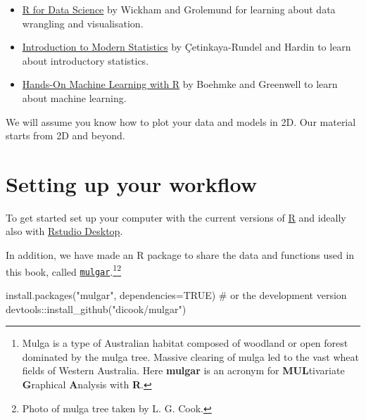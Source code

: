 \documentclass[
  letterpaper,
]{krantz}
\newenvironment{Shaded}{\begin{snugshade}}{\end{snugshade}}
\newcommand{\AttributeTok}[1]{\textcolor[rgb]{0.40,0.45,0.13}{#1}}
\newcommand{\CommentTok}[1]{\textcolor[rgb]{0.37,0.37,0.37}{#1}}
\newcommand{\ConstantTok}[1]{\textcolor[rgb]{0.56,0.35,0.01}{#1}}
\newcommand{\FunctionTok}[1]{\textcolor[rgb]{0.28,0.35,0.67}{#1}}
\newcommand{\NormalTok}[1]{\textcolor[rgb]{0.00,0.23,0.31}{#1}}
\newcommand{\SpecialCharTok}[1]{\textcolor[rgb]{0.37,0.37,0.37}{#1}}
\newcommand{\StringTok}[1]{\textcolor[rgb]{0.13,0.47,0.30}{#1}}
\providecommand{\tightlist}{%
  \setlength{\itemsep}{0pt}\setlength{\parskip}{0pt}}\usepackage{longtable,booktabs,array}
\begin{document}
\begin{itemize}
\tightlist
\item
  \href{https://r4ds.had.co.nz}{R for Data Science} by Wickham and
  Grolemund for learning about data wrangling and visualisation.
\item
  \href{https://openintro-ims.netlify.app}{Introduction to Modern
  Statistics} by Çetinkaya-Rundel and Hardin to learn about introductory
  statistics.
\item
  \href{https://bradleyboehmke.github.io/HOML/}{Hands-On Machine
  Learning with R} by Boehmke and Greenwell to learn about machine
  learning.
\end{itemize}

We will assume you know how to plot your data and models in 2D. Our
material starts from 2D and beyond.

\hypertarget{setting-up-your-workflow}{%
\section*{Setting up your workflow}\label{setting-up-your-workflow}}


To get started set up your computer with the current versions of
\href{https://cran.r-project.org}{R} and ideally also with
\href{https://posit.co/download/rstudio-desktop/}{Rstudio Desktop}.

In addition, we have made an R package to share the data and functions
used in this book, called
\href{http://dicook.github.io/mulgar}{\texttt{mulgar}}.\footnote{Mulga
  is a type of Australian habitat composed of woodland or open forest
  dominated by the mulga tree. Massive clearing of mulga led to the vast
  wheat fields of Western Australia. Here \textbf{mulgar} is an acronym
  for \textbf{MUL}tivariate \textbf{G}raphical \textbf{A}nalysis with
  \textbf{R}.}\footnote{Photo of mulga tree taken by L. G. Cook.}

\begin{Shaded}
\begin{Highlighting}[]
\FunctionTok{install.packages}\NormalTok{(}\StringTok{"mulgar"}\NormalTok{, }\AttributeTok{dependencies=}\ConstantTok{TRUE}\NormalTok{)}
\CommentTok{\# or the development version}
\NormalTok{devtools}\SpecialCharTok{::}\FunctionTok{install\_github}\NormalTok{(}\StringTok{"dicook/mulgar"}\NormalTok{)}
\end{Highlighting}
\end{Shaded}
\end{document}
